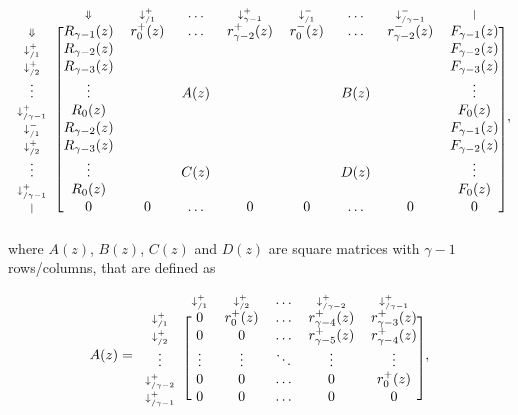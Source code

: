 \documentclass{article}
\begin{document}
\begin{equation*}
\begin{blockarray}{ccccccccc}
   & \scriptstyle{\Downarrow} & \scriptstyle{\downarrow_{/1}^+} & 
    \ldots & \scriptstyle{\downarrow_{\gamma-1}^+} &
    \scriptstyle{\downarrow_{/1}^-} & \ldots &
    \scriptstyle{\downarrow_{/\gamma-1}^-} & \scriptstyle{|} \\
\begin{block}{c[cccccccc]}
\scriptstyle{\Downarrow} & R_{\gamma-1}(z)  & r_0^+(z) & \ldots &
    r_{\gamma-2}^+(z) & r_0^-(z) & \ldots & r_{\gamma-2}^-(z) &
    F_{\gamma-1}(z) \\
\scriptstyle{\downarrow_{/1}^+} & R_{\gamma-2}(z) & & & & & & &
    F_{\gamma-2}(z) \\
\scriptstyle{\downarrow_{/2}^+} & R_{\gamma-3}(z) & & & & & & &
    F_{\gamma-3}(z) \\
\vdots & \vdots & & A(z) & & & B(z) & & \vdots \\
\scriptstyle{\downarrow_{/\gamma-1}^+} & R_0(z) & & & & & & & F_0(z) \\
\scriptstyle{\downarrow_{/1}^-} & R_{\gamma-2}(z) & & & & & & &
    F_{\gamma-1}(z) \\
\scriptstyle{\downarrow_{/2}^+} & R_{\gamma-3}(z) & & & & & & &
    F_{\gamma-2}(z) \\
\vdots & \vdots & & C(z) & & & D(z) & & \vdots \\
\scriptstyle{\downarrow_{/\gamma-1}^+} & R_0(z) & & & & & & & F_0(z) \\
\scriptstyle{|} & 0 & 0 & \ldots & 0 & 0 & \ldots & 0 & 0 \\
\end{block}
\end{blockarray},
\end{equation*}
where $A(z)$, $B(z)$, $C(z)$ and $D(z)$ are square matrices with
$\gamma-1$ rows/columns, that are defined as

\begin{equation*}
A(z) = 
\begin{blockarray}{cccccc}
   & \scriptstyle{\downarrow_{/1}^+} & \scriptstyle{\downarrow_{/2}^+} &
    \ldots & \scriptstyle{\downarrow_{/\gamma-2}^+} &
    \scriptstyle{\downarrow_{/\gamma-1}^+} \\
\begin{block}{c[ccccc]}
\scriptstyle{\downarrow_{/1}^+} & 0 & r_0^+(z) & \ldots &
    r_{\gamma-4}^+(z) & r_{\gamma-3}^+(z) \\
\scriptstyle{\downarrow_{/2}^+} & 0 & 0 & \ldots &
    r_{\gamma-5}^+(z) & r_{\gamma-4}^+(z) \\
\vdots & \vdots & \vdots & \ddots & \vdots & \vdots \\
\scriptstyle{\downarrow_{/\gamma-2}^+} & 0 & 0 & \ldots & 0 & r_0^+(z) \\
\scriptstyle{\downarrow_{/\gamma-1}^+} & 0 & 0 & \ldots & 0 & 0 \\
\end{block}
\end{blockarray},
\end{equation*}
\end{document}
